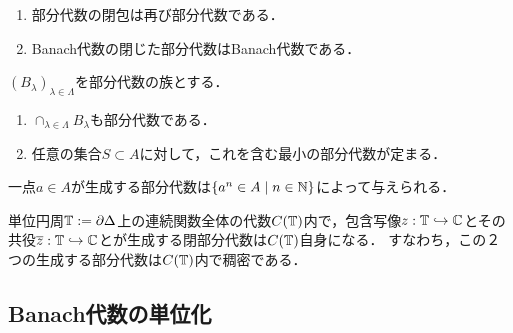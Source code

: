 \documentclass[uplatex,dvipdfmx]{jsreport}
\begin{document}
\begin{lemma}\mbox{}
    \begin{enumerate}
        \item 部分代数の閉包は再び部分代数である．
        \item Banach代数の閉じた部分代数はBanach代数である．
    \end{enumerate}
\end{lemma}

\begin{lemma}
    $(B_\lambda)_{\lambda\in\Lambda}$を部分代数の族とする．
    \begin{enumerate}
        \item $\cap_{\lambda\in\Lambda}B_\lambda$も部分代数である．
        \item 任意の集合$S\subset A$に対して，これを含む最小の部分代数が定まる．
    \end{enumerate}
\end{lemma}

\begin{example}
    一点$a\in A$が生成する部分代数は$\left\{a^n\in A\mid n\in\mathbb{N}\right\}$によって与えられる．
\end{example}

\begin{example}
    単位円周$\mathbb{T}:=\partial\Delta$上の連続関数全体の代数$C(\mathbb{T})$内で，包含写像$z:\mathbb{T}\hookrightarrow\mathbb{C}$とその共役$\overline{z}:\mathbb{T}\hookrightarrow\mathbb{C}$とが生成する閉部分代数は$C(\mathbb{T})$自身になる．
    すなわち，この２つの生成する部分代数は$C(\mathbb{T})$内で稠密である．
\end{example}

\subsection{Banach代数の単位化}
\end{document}
